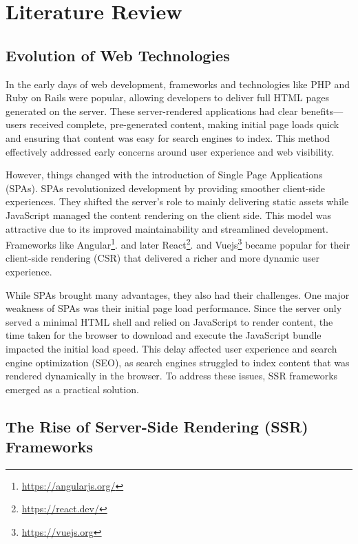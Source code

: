 \section{Literature Review} %

\subsection{Evolution of Web Technologies}

In the early days of web development, frameworks and technologies like PHP and Ruby on Rails were popular, allowing developers to deliver full HTML pages generated on the server. These server-rendered applications had clear benefits—users received complete, pre-generated content, making initial page loads quick and ensuring that content was easy for search engines to index. This method effectively addressed early concerns around user experience and web visibility.

However, things changed with the introduction of Single Page Applications (SPAs). SPAs revolutionized development by providing smoother client-side experiences. They shifted the server’s role to mainly delivering static assets while JavaScript managed the content rendering on the client side. This model was attractive due to its improved maintainability and streamlined development. Frameworks like Angular\footnote{\url{https://angularjs.org/}}. and later React\footnote{\url{https://react.dev/}}. and Vuejs\footnote{\url{https://vuejs.org}} became popular for their client-side rendering (CSR) that delivered a richer and more dynamic user experience.


While SPAs brought many advantages, they also had their challenges. One major weakness of SPAs was their initial page load performance. Since the server only served a minimal HTML shell and relied on JavaScript to render content, the time taken for the browser to download and execute the JavaScript bundle impacted the initial load speed. This delay affected user experience and search engine optimization (SEO), as search engines struggled to index content that was rendered dynamically in the browser. To address these issues, SSR frameworks emerged as a practical solution.


\subsection{The Rise of Server-Side Rendering (SSR) Frameworks}

